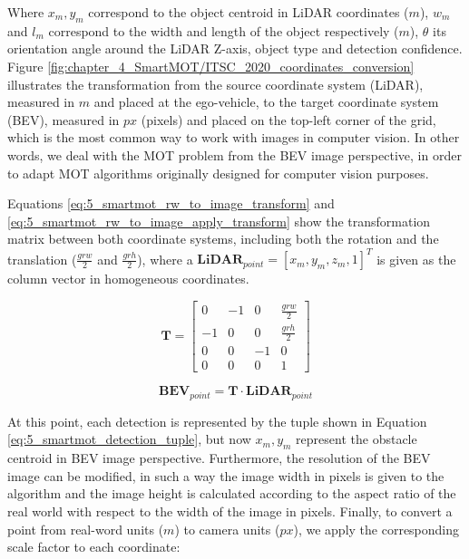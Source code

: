 Where $\textit{$x_{m},y_{m}$}$ correspond to the object centroid in LiDAR coordinates ($\textit{m}$), $\textit{$w_{m}$}$ and $\textit{$l_{m}$}$ correspond to the width and length of the object respectively ($\textit{m}$), $\theta$ its orientation angle around the LiDAR Z-axis, object type and detection confidence. Figure \ref{fig:chapter_4_SmartMOT/ITSC_2020_coordinates_conversion} illustrates the transformation from the source coordinate system (LiDAR), measured in $\textit{m}$ and placed at the ego-vehicle, to the target coordinate system (BEV), measured in $\textit{px}$ (pixels) and placed on the top-left corner of the grid, which is the most common way to work with images in computer vision. In other words, we deal with the \ac{MOT} problem from the \ac{BEV} image perspective, in order to adapt \ac{MOT} algorithms originally designed for computer vision purposes. 

Equations \ref{eq:5_smartmot_rw_to_image_transform} and \ref{eq:5_smartmot_rw_to_image_apply_transform} show the transformation matrix between both coordinate systems, including both the rotation and the translation (\textit{$\frac{grw}{2}$} and \textit{$\frac{grh}{2}$}), where a $\textbf{LiDAR}_{point}=[x_{m},y_{m},z_{m},1]^{T}$ is given as the column vector in homogeneous coordinates.

\begin{equation}
	\label{eq:5_smartmot_rw_to_image_transform}
	\textbf{T} = \left[ \begin{array}{cccc}
		0  &  -1 &  0  &  \frac{grw}{2} \\
		-1 &  0  &  0  &  \frac{grh}{2} \\
		0  &  0  &  -1 &  0            \\
		0  &  0  &  0  &  1 \end{array} \right] 
\end{equation}

\begin{equation}
	\label{eq:5_smartmot_rw_to_image_apply_transform}
	\textbf{BEV}_{point} = \textbf{T} \cdot \textbf{LiDAR}_{point}
\end{equation}

At this point, each detection is represented by the tuple shown in Equation \ref{eq:5_smartmot_detection_tuple}, but now \textit{$x_{m},y_{m}$} represent the obstacle centroid in \ac{BEV} image perspective. Furthermore, the resolution of the \ac{BEV} image can be modified, in such a way the image width in pixels is given to the algorithm and the image height is calculated according to the aspect ratio of the real world with respect to the width of the image in pixels. Finally, to convert a point from real-word units ($\textit{m}$) to camera units ($\textit{px}$), we apply the corresponding scale factor to each coordinate:

